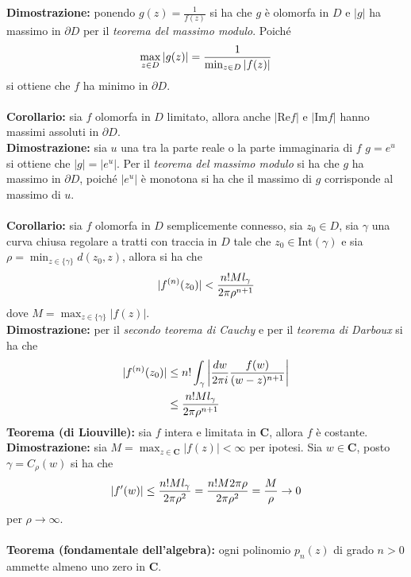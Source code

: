 \documentclass{article}
\begin{document}
\textbf{Dimostrazione:} ponendo $g(z) = \frac{1}{f(z)}$ si ha che $g$ è olomorfa in $D$ e $|g|$ ha massimo in $\partial D$ per il \textit{teorema del massimo modulo}. Poiché
\begin{gather}
    \max_{z \in D}|g(z)| = \frac{1}{\min_{z \in D}|f(z)|} \notag
\end{gather}
si ottiene che $f$ ha minimo in $\partial D$. \\ \\
\textbf{Corollario:} sia $f$ olomorfa in $D$ limitato, allora anche $|\mathrm{Re}f|$ e $|\mathrm{Im}f|$ hanno massimi assoluti in $\partial D$. \\

\textbf{Dimostrazione:} sia $u$ una tra la parte reale o la parte immaginaria di $f$ $g = e^u$ si ottiene che $|g| = |e^u|$. Per il \textit{teorema del massimo modulo} si ha che $g$ ha massimo in $\partial D$, poiché $|e^u|$ è monotona si ha che il massimo di $g$ corrisponde al massimo di $u$. \\ \\
\textbf{Corollario:} sia $f$ olomorfa in $D$ semplicemente connesso, sia $z_0 \in D$, sia $\gamma$ una curva chiusa regolare a tratti con traccia in $D$ tale che $z_0 \in \mathrm{Int}(\gamma)$ e sia $\rho = \min_{z \in \{\gamma\}}d(z_0, z)$, allora si ha che
\begin{gather}
    |f^{(n)}(z_0)| < \frac{n!Ml_\gamma}{2\pi \rho^{n + 1}} \notag
\end{gather}
dove $M = \max_{z \in \{\gamma\}}|f(z)|$. \\

\textbf{Dimostrazione:} per il \textit{secondo teorema di Cauchy} e per il \textit{teorema di Darboux} si ha che
\begin{align}
    |f^{(n)}(z_0)| &\leq n!\int_\gamma\left|\frac{dw}{2\pi i}\frac{f(w)}{(w - z)^{n + 1}}\right| \notag \\
    &\leq \frac{n!Ml_\gamma}{2\pi\rho^{n + 1}} \notag
\end{align}
\textbf{Teorema (di Liouville):} sia $f$ intera e limitata in $\mathbf{C}$, allora $f$ è costante. \\

\textbf{Dimostrazione:} sia $M = \max_{z \in \mathbf{C}}|f(z)| < \infty$ per ipotesi. Sia $w \in \mathbf{C}$, posto $\gamma = C_\rho(w)$ si ha che
\begin{gather}
    |f'(w)| \leq \frac{n!Ml_\gamma}{2\pi\rho^2} = \frac{n!M2\pi\rho}{2\pi\rho^2} = \frac{M}{\rho} \rightarrow 0 \notag
\end{gather}
per $\rho \rightarrow \infty$. \\ \\
\textbf{Teorema (fondamentale dell'algebra):} ogni polinomio $p_n(z)$ di grado $n > 0$ ammette almeno uno zero in $\mathbf{C}$. \\
\end{document}

